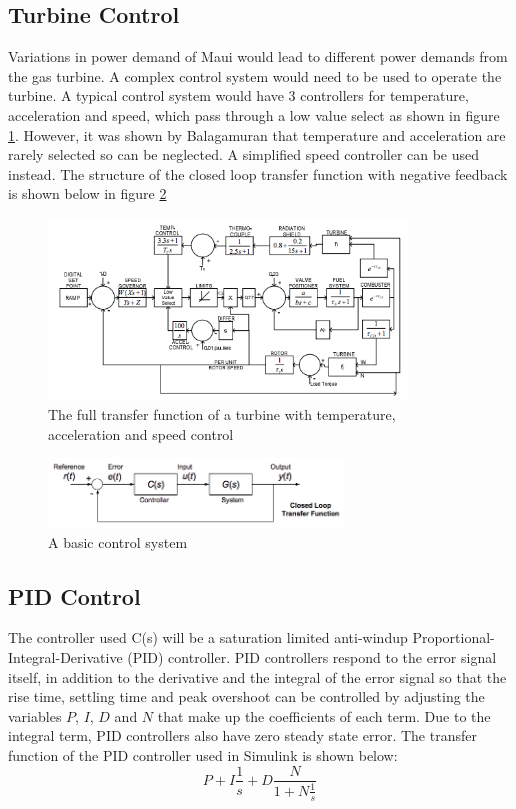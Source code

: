 \documentclass[11pt, oneside]{article}
\begin{document}
\subsection{Turbine Control}
Variations in power demand of Maui would lead to different power demands from the gas turbine. A complex control system would need to be used to operate the turbine. A typical control system would have 3 controllers for temperature, acceleration and speed, which pass through a low value select as shown in figure \ref{fig:turbinecont}. However, it was shown by Balagamuran \cite{balagamuran} that temperature and acceleration are rarely selected so can be neglected. A simplified speed controller can be used instead. The structure of the closed loop transfer function with negative feedback is shown below in figure \ref{fig:control}

\begin{figure} [h]
\centering
\includegraphics[width=0.85\textwidth]{./pictures/turbinecont.png}
  \caption{The full transfer function of a turbine with temperature, acceleration and speed control \cite{balagamuran}} \label{fig:turbinecont}
  \end{figure}
  
\begin{figure} [h]
\centering
\includegraphics[width=0.7\textwidth]{./pictures/controlsystem.png}
  \caption{A basic control system \cite{A2notes}} \label{fig:control}
  \end{figure}
\subsection{PID Control}

The controller used C(s) will be a saturation limited anti-windup Proportional-Integral-Derivative (PID) controller. PID controllers respond to the error signal itself, in addition to the derivative and the integral of the error signal so that the rise time, settling time and peak overshoot can be controlled by adjusting the variables $P$, $I$, $D$ and $N$ that make up the coefficients of each term. Due to the integral term, PID controllers also have zero steady state error. The transfer function of the PID controller used in Simulink is shown below:
\begin{equation}
P + I\frac{1}{s} + D\frac{N}{1+N\frac{1}{s}}
\end{equation}
\end{document}
